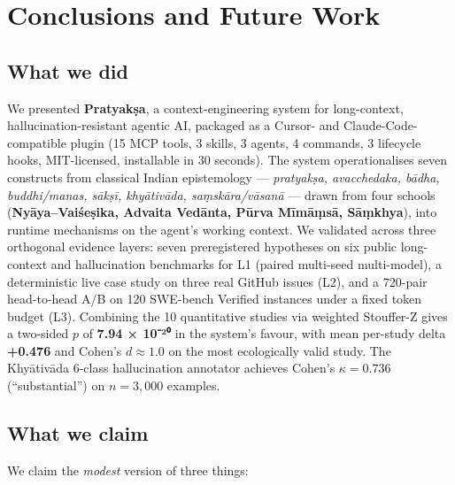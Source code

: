 \section{Conclusions and Future Work}\label{conclusions-and-future-work}

\subsection{What we did}\label{what-we-did}

We presented \textbf{Pratyakṣa}, a context-engineering system for long-context, hallucination-resistant agentic AI, packaged as a Cursor- and Claude-Code-compatible plugin (15 MCP tools, 3 skills, 3 agents, 4 commands, 3 lifecycle hooks, MIT-licensed, installable in 30 seconds). The system operationalises seven constructs from classical Indian epistemology --- \emph{pratyakṣa, avacchedaka, bādha, buddhi/manas, sākṣī, khyātivāda, saṃskāra/vāsanā} --- drawn from four schools (\textbf{Nyāya--Vaiśeṣika, Advaita Vedānta, Pūrva Mīmāṃsā, Sāṃkhya}), into runtime mechanisms on the agent's working context. We validated across three orthogonal evidence layers: seven preregistered hypotheses on six public long-context and hallucination benchmarks for L1 (paired multi-seed multi-model), a deterministic live case study on three real GitHub issues (L2), and a 720-pair head-to-head A/B on 120 SWE-bench Verified instances under a fixed token budget (L3). Combining the 10 quantitative studies via weighted Stouffer-Z gives a two-sided \(p\) of \textbf{7.94 × 10⁻²⁰} in the system's favour, with mean per-study delta \textbf{+0.476} and Cohen's \(d \approx \mathbf{1.0}\) on the most ecologically valid study. The Khyātivāda 6-class hallucination annotator achieves Cohen's \(\kappa = \mathbf{0.736}\) (``substantial'') on \(n = 3{,}000\) examples.

\subsection{What we claim}\label{what-we-claim}

We claim the \emph{modest} version of three things:

